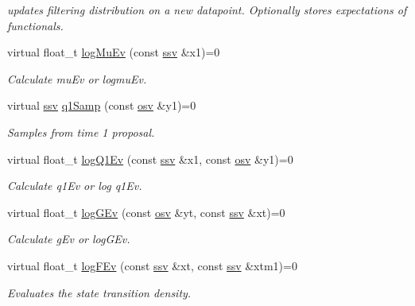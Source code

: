 \begin{DoxyCompactItemize}
\begin{DoxyCompactList}\small\item\em updates filtering distribution on a new datapoint. Optionally stores expectations of functionals. \end{DoxyCompactList}\item 
virtual float\+\_\+t \hyperlink{classSISRFilter_a816874b65650e8900fe3470bafb957cf}{log\+Mu\+Ev} (const \hyperlink{classSISRFilter_ada0fdfca451ed6a22a8bba48a881819d}{ssv} \&x1)=0
\begin{DoxyCompactList}\small\item\em Calculate mu\+Ev or logmu\+Ev. \end{DoxyCompactList}\item 
virtual \hyperlink{classSISRFilter_ada0fdfca451ed6a22a8bba48a881819d}{ssv} \hyperlink{classSISRFilter_ad57e5371860959301c4e88cb74736577}{q1\+Samp} (const \hyperlink{classSISRFilter_a42325662bf3d057ccc3eaa75fa2f70f9}{osv} \&y1)=0
\begin{DoxyCompactList}\small\item\em Samples from time 1 proposal. \end{DoxyCompactList}\item 
virtual float\+\_\+t \hyperlink{classSISRFilter_a4088dd5a2df7a7c7c9f1b41cda74c73d}{log\+Q1\+Ev} (const \hyperlink{classSISRFilter_ada0fdfca451ed6a22a8bba48a881819d}{ssv} \&x1, const \hyperlink{classSISRFilter_a42325662bf3d057ccc3eaa75fa2f70f9}{osv} \&y1)=0
\begin{DoxyCompactList}\small\item\em Calculate q1\+Ev or log q1\+Ev. \end{DoxyCompactList}\item 
virtual float\+\_\+t \hyperlink{classSISRFilter_ad87c1090d23ed5da2a5ff6ddbca6a408}{log\+G\+Ev} (const \hyperlink{classSISRFilter_a42325662bf3d057ccc3eaa75fa2f70f9}{osv} \&yt, const \hyperlink{classSISRFilter_ada0fdfca451ed6a22a8bba48a881819d}{ssv} \&xt)=0
\begin{DoxyCompactList}\small\item\em Calculate g\+Ev or log\+G\+Ev. \end{DoxyCompactList}\item 
virtual float\+\_\+t \hyperlink{classSISRFilter_a1f888124bcec1ebaaec3b4e1afd3fa74}{log\+F\+Ev} (const \hyperlink{classSISRFilter_ada0fdfca451ed6a22a8bba48a881819d}{ssv} \&xt, const \hyperlink{classSISRFilter_ada0fdfca451ed6a22a8bba48a881819d}{ssv} \&xtm1)=0
\begin{DoxyCompactList}\small\item\em Evaluates the state transition density. \end{DoxyCompactList}\item 

\end{DoxyCompactItemize}
